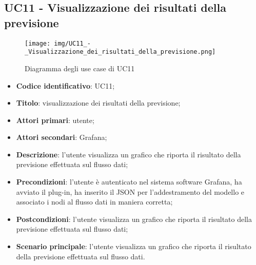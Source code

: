 \subsection{UC11 - Visualizzazione dei risultati della previsione}
\begin{figure}[H]
\texttt{[image: img/UC11\_-\_Visualizzazione\_dei\_risultati\_della\_previsione.png]}
\caption{Diagramma degli use case di UC11}
\end{figure}
\begin{itemize}
    \item \textbf{Codice identificativo}: UC11;
    \item \textbf{Titolo}: visualizzazione dei risultati della previsione;
    \item \textbf{Attori primari}: utente;
    \item \textbf{Attori secondari}: Grafana\glo;
    \item \textbf{Descrizione}: l'utente visualizza un grafico che riporta il risultato della previsione effettuata sul flusso dati;
    \item \textbf{Precondizioni}: l'utente è autenticato nel sistema software Grafana\glosp, ha avviato il plug-in, ha inserito il JSON per l'addestramento del modello e associato i nodi al flusso dati in maniera corretta;
    \item \textbf{Postcondizioni}: l'utente visualizza un grafico che riporta il risultato della previsione effettuata sul flusso dati;
    \item \textbf{Scenario principale}: l'utente visualizza un grafico che riporta il risultato della previsione effettuata sul flusso dati.
\end{itemize}